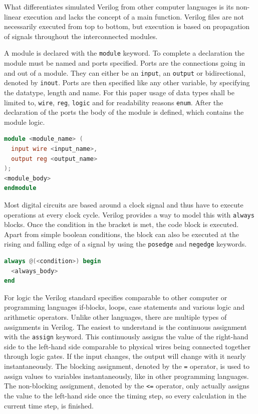 What differentiates simulated Verilog from other computer languages is its non-linear execution and lacks the concept of a main function. Verilog files are not necessarily executed from top to bottom, but execution is based on propagation of signals throughout the interconnected modules. 

A module is declared with the \texttt{module} keyword. To complete a declaration the module must be named and ports specified. Ports are the connections going in and out of a module. They can either be an \texttt{input}, an \texttt{output} or bidirectional, denoted by \texttt{inout}. Ports are then specified like any other variable, by specifying the datatype, length and name. For this paper usage of data types shall be limited to, \texttt{wire}, \texttt{reg}, \texttt{logic} and for readability reasons \texttt{enum}. After the declaration of the ports the body of the module is defined, which contains the module logic.

\begin{lstlisting}[language=Verilog, caption=Module definition]
module <module_name> (
  input wire <input_name>,
  output reg <output_name>
);
<module_body>
endmodule
\end{lstlisting}


Most digital circuits are based around a clock signal and thus have to execute operations at every clock cycle. Verilog provides a way to model this with \texttt{always} blocks. Once the condition in the bracket is met, the code block is executed. Apart from simple boolean conditions, the block can also be executed at the rising and falling edge of a signal by using the \texttt{posedge} and \texttt{negedge} keywords.

\begin{lstlisting}[language=Verilog, caption=Always block definition]
always @(<condition>) begin
  <always_body>
end

\end{lstlisting}

For logic the Verilog standard specifies comparable to other computer or programming languages if-blocks, loops, case statements and various logic and arithmetic operators. Unlike other languages, there are multiple types of assignments in Verilog. The easiest to understand is the continuous assignment with the \texttt{assign} keyword. This continuously assigns the value of the right-hand side to the left-hand side comparable to physical wires being connected together through logic gates. If the input changes, the output will change with it nearly instantaneously. The blocking assignment, denoted by the \texttt{=} operator, is used to assign values to variables instantaneously, like in other programming languages. The non-blocking assignment, denoted by the \texttt{<=} operator, only actually assigns the value to the left-hand side once the timing step, so every calculation in the current time step, is finished. 

